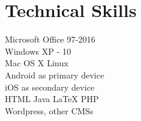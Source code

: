 \documentclass[]{deedy-resume-openfont}
\begin{document}
\begin{minipage}[t]{0.33\textwidth}
\sectionsep


\section{Technical Skills}
\textbullet Microsoft Office 97-2016\\
\textbullet Windows XP - 10\\
\textbullet Mac OS X
\textbullet Linux \\
\textbullet Android as primary device \\
\textbullet iOS as secondary device\\
\textbullet HTML
\textbullet Java
\textbullet \LaTeX
\textbullet PHP \\
\textbullet Wordpress, other CMSs  \\

\sectionsep

%
%

\end{minipage} 
\hfill
\end{document}
